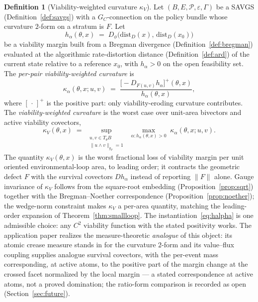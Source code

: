 \documentclass[11pt,a4paper]{article}
\theoremstyle{plain}
\theoremstyle{definition}
\newtheorem{definition}[theorem]{Definition}
\theoremstyle{remark}
\newcommand{\kk}{\kappa_{\!V}}
\newcommand{\distD}{\mathrm{dist}_{D}}
\begin{document}
\begin{definition}[Viability-weighted curvature $\kk$]
\label{def:kv}
Let $(B, E, \mathcal P, \varepsilon, \Gamma)$ be a SAVGS
(Definition~\ref{def:savgs}) with a $G_C$-connection on the policy
bundle whose curvature $2$-form on a stratum is $F$. Let
\begin{equation}\label{eq:halpha}
  h_\alpha(\theta, x) \;=\; D_\phi\bigl(\distD(x),\, \distD(x_0)\bigr)
\end{equation}
be a viability margin built from a Bregman divergence
(Definition~\ref{def:bregman}) evaluated at the algorithmic
rate-distortion distance (Definition~\ref{def:ard}) of the current
state relative to a reference $x_0$, with $h_\alpha > 0$ on the open
feasibility set. The \emph{per-pair viability-weighted curvature} is
\begin{equation}\label{eq:kv-pair}
  \kappa_\alpha(\theta, x; u, v) \;=\;
  \frac{\bigl[-D_{F(u,v)}h_\alpha\bigr]^+(\theta, x)}
       {h_\alpha(\theta, x)},
\end{equation}
where $[\,\cdot\,]^+$ is the positive part: only viability-eroding
curvature contributes. The \emph{viability-weighted curvature} is the
worst case over unit-area bivectors and active viability covectors,
\begin{equation}\label{eq:kv}
  \kk(\theta, x) \;=\; \sup_{\substack{u, v \in T_\theta B \\
  \|u \wedge v\|_{g_F} = 1}}\;
  \max_{\alpha : h_\alpha(\theta, x) > 0}\;
  \kappa_\alpha(\theta, x; u, v).
\end{equation}
The quantity $\kk(\theta, x)$ is the worst fractional loss of
viability margin per unit oriented environmental-loop area, to
leading order; it contracts the geometric defect $F$ with the
survival covectors $D h_\alpha$ instead of reporting $\|F\|$ alone.
Gauge invariance of $\kk$ follows from the square-root embedding
(Proposition~\ref{prop:sqrt}) together with the Bregman--Noether
correspondence (Proposition~\ref{prop:noether}); the wedge-norm
constraint makes $\kk$ a per-area quantity, matching the
leading-order expansion of Theorem~\ref{thm:smallloop}. The
instantiation~\eqref{eq:halpha} is one admissible choice: any $C^2$
viability function with the stated positivity works. The
application paper \citep{zai2026measure} realizes the
measure-theoretic \emph{analogue} of this object: its atomic crease
measure stands in for the curvature $2$-form and its value--flux
coupling supplies analogue survival covectors, with the per-event
mass corresponding, at active atoms, to the positive part of the
margin change at the crossed facet normalized by the local margin
--- a stated correspondence at active atoms, not a proved
domination; the ratio-form comparison is recorded as open
(Section~\ref{sec:future}).
\end{definition}
\end{document}
